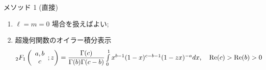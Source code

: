 \documentclass[pdf,notes]{beamer}
\newcommand{\mybigplus}{\scalebox{2.0}{$+$}}
\begin{document}
\begin{frame}{メソッド 1 (直接)}
	\scriptsize
	\begin{enumerate}
		\item $\ell=m=0$ 場合を扱えばよい;
		\item 
					{超幾何関数のオイラー積分表示}
			\begin{equation*}
					{}_2F_1\left(\begin{array}[]{c}
						a,b\\c
					\end{array};z  \right)=\frac{\Gamma(c)}{\Gamma(b)\Gamma(c-b)}\textstyle\int_0^1x^{b-1}(1-x)^{c-b-1}(1-zx)^{-a}dx,\quad\Re(c)>\Re(b)>0
			\end{equation*}

\end{enumerate}
\end{frame}
\end{document}
